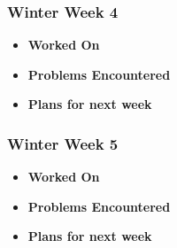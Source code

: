 \documentclass[compsoc,draftclsnofoot,onecolumn,10pt]{IEEEtran}
\begin{document}
\subsubsection{Winter Week 4}
\begin{itemize}
    \item {\textbf{Worked On}}
    \begin{itemize}
        
    \end{itemize}

    \item {\textbf{Problems Encountered}}
    \begin{itemize}
        
    \end{itemize}

    \item{\textbf{Plans for next week}}
    \begin{itemize}
        
    \end{itemize}

\end{itemize}

\subsubsection{Winter Week 5}
\begin{itemize}
    \item {\textbf{Worked On}}
    \begin{itemize}
        
    \end{itemize}

    \item {\textbf{Problems Encountered}}
    \begin{itemize}
        
    \end{itemize}

    \item{\textbf{Plans for next week}}
    \begin{itemize}
        
    \end{itemize}

\end{itemize}
\end{document}
